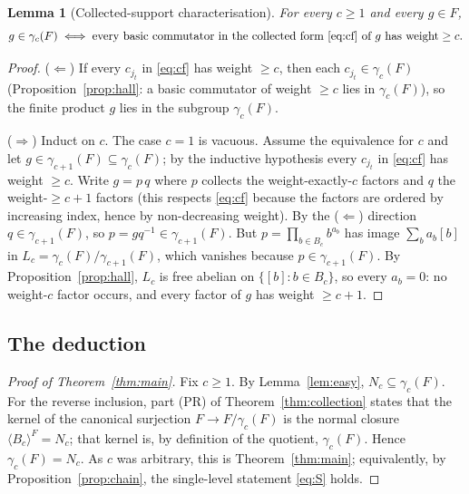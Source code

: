 \documentclass{amsart}
\newtheorem{lemma}{Lemma}
\theoremstyle{definition}
\theoremstyle{remark}
\begin{document}
\begin{lemma}[Collected-support characterisation]\label{lem:support}
For every $c\ge1$ and every $g\in F$,
\[
g\in\gamma_c(F)\iff\text{every basic commutator in the collected form \eqref{eq:cf}
of $g$ has weight}\ge c .
\]
\end{lemma}
\begin{proof}
($\Leftarrow$) If every $c_{j_t}$ in \eqref{eq:cf} has weight $\ge c$, then each
$c_{j_t}\in\gamma_c(F)$ (Proposition~\ref{prop:hall}: a basic commutator of weight
$\ge c$ lies in $\gamma_c(F)$), so the finite product $g$ lies in the subgroup
$\gamma_c(F)$.

($\Rightarrow$) Induct on $c$. The case $c=1$ is vacuous. Assume the equivalence for $c$
and let $g\in\gamma_{c+1}(F)\subseteq\gamma_c(F)$; by the inductive hypothesis every
$c_{j_t}$ in \eqref{eq:cf} has weight $\ge c$. Write $g=p\,q$ where $p$ collects the
weight-exactly-$c$ factors and $q$ the weight-$\ge c+1$ factors (this respects
\eqref{eq:cf} because the factors are ordered by increasing index, hence by
non-decreasing weight). By the ($\Leftarrow$) direction $q\in\gamma_{c+1}(F)$, so
$p=gq^{-1}\in\gamma_{c+1}(F)$. But $p=\prod_{b\in B_c}b^{a_b}$ has image $\sum_b a_b[b]$
in $L_c=\gamma_c(F)/\gamma_{c+1}(F)$, which vanishes because $p\in\gamma_{c+1}(F)$. By
Proposition~\ref{prop:hall}, $L_c$ is free abelian on $\{[b]:b\in B_c\}$, so every
$a_b=0$: no weight-$c$ factor occurs, and every factor of $g$ has weight $\ge c+1$.
\end{proof}

\subsection*{The deduction}

\begin{proof}[Proof of Theorem~\ref{thm:main}]
Fix $c\ge1$. By Lemma~\ref{lem:easy}, $N_c\subseteq\gamma_c(F)$. For the reverse
inclusion, part (PR) of Theorem~\ref{thm:collection} states that the kernel of the
canonical surjection $F\to F/\gamma_c(F)$ is the normal closure
$\langle B_c\rangle^{F}=N_c$; that kernel is, by definition of the quotient,
$\gamma_c(F)$. Hence $\gamma_c(F)=N_c$. As $c$ was arbitrary, this is
Theorem~\ref{thm:main}; equivalently, by Proposition~\ref{prop:chain}, the single-level
statement \eqref{eq:S} holds.
\end{proof}
\end{document}
